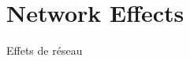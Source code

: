 \stars

















\newpage

\section{Network Effects}{Effets de réseau}

\label{app:sec:interactiongibrat}









 


%



